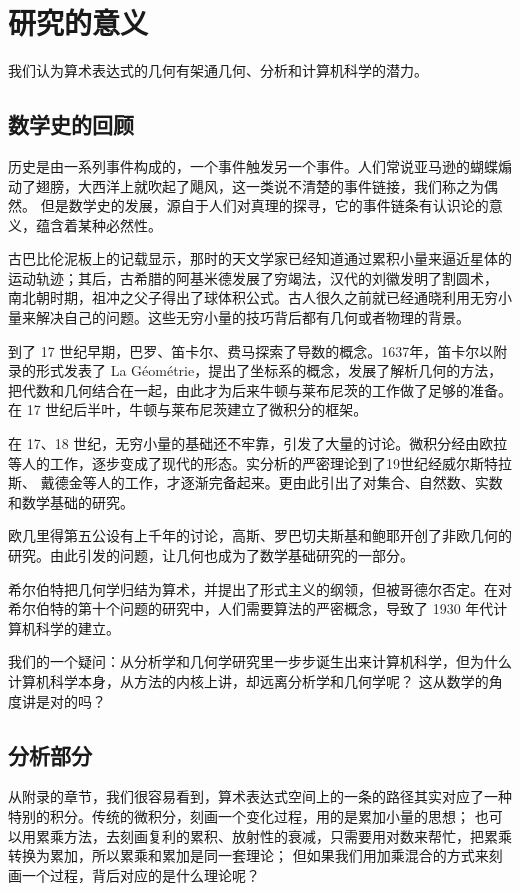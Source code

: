 \documentclass[a4paper,12pt]{article}
\numberwithin{problem}{section}
\numberwithin{definition}{section}
\numberwithin{lemma}{section}
\numberwithin{proposition}{section}
\numberwithin{theorem}{section}
\numberwithin{grammar}{section}
\numberwithin{program}{section}
\numberwithin{convention}{section}
\numberwithin{corollary}{section}
\begin{document}
\newpage

\section{研究的意义}

我们认为算术表达式的几何有架通几何、分析和计算机科学的潜力。

\subsection{数学史的回顾}

历史是由一系列事件构成的，一个事件触发另一个事件。人们常说亚马逊的蝴蝶煽动了翅膀，大西洋上就吹起了飓风，这一类说不清楚的事件链接，我们称之为偶然。
但是数学史的发展，源自于人们对真理的探寻，它的事件链条有认识论的意义，蕴含着某种必然性。

古巴比伦泥板上的记载显示，那时的天文学家已经知道通过累积小量来逼近星体的运动轨迹；其后，古希腊的阿基米德发展了穷竭法，汉代的刘徽发明了割圆术，
南北朝时期，祖冲之父子得出了球体积公式。古人很久之前就已经通晓利用无穷小量来解决自己的问题。这些无穷小量的技巧背后都有几何或者物理的背景。

到了 17 世纪早期，巴罗、笛卡尔、费马探索了导数的概念。1637年，笛卡尔以附录的形式发表了 La Géométrie，提出了坐标系的概念，发展了解析几何的方法，
把代数和几何结合在一起，由此才为后来牛顿与莱布尼茨的工作做了足够的准备。在 17 世纪后半叶，牛顿与莱布尼茨建立了微积分的框架。

在 17、18 世纪，无穷小量的基础还不牢靠，引发了大量的讨论。微积分经由欧拉等人的工作，逐步变成了现代的形态。实分析的严密理论到了19世纪经威尔斯特拉斯、
戴德金等人的工作，才逐渐完备起来。更由此引出了对集合、自然数、实数和数学基础的研究。

欧几里得第五公设有上千年的讨论，高斯、罗巴切夫斯基和鲍耶开创了非欧几何的研究。由此引发的问题，让几何也成为了数学基础研究的一部分。

希尔伯特把几何学归结为算术，并提出了形式主义的纲领，但被哥德尔否定。在对希尔伯特的第十个问题的研究中，人们需要算法的严密概念，导致了 1930 年代计算机科学的建立。

我们的一个疑问：从分析学和几何学研究里一步步诞生出来计算机科学，但为什么计算机科学本身，从方法的内核上讲，却远离分析学和几何学呢？
这从数学的角度讲是对的吗？

\subsection{分析部分}

从附录的章节，我们很容易看到，算术表达式空间上的一条的路径其实对应了一种特别的积分。传统的微积分，刻画一个变化过程，用的是累加小量的思想；
也可以用累乘方法，去刻画复利的累积、放射性的衰减，只需要用对数来帮忙，把累乘转换为累加，所以累乘和累加是同一套理论；
但如果我们用加乘混合的方式来刻画一个过程，背后对应的是什么理论呢？
\end{document}
